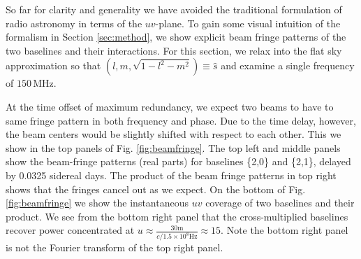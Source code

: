 \documentclass[twocolumn,apj,numberedappendix]{emulateapj}
\renewcommand\[{\begin{equation}}
\renewcommand\]{\end{equation}}
\begin{document}
So far for clarity and generality we have avoided the traditional formulation of radio astronomy in terms of the $uv$-plane. To gain some visual intuition of the formalism in Section \ref{sec:method}, we show explicit beam fringe patterns of the two baselines and their interactions. For this section, we relax into the flat sky approximation so that $(l,m,\sqrt{1-l^2-m^2})\equiv\hat{s}$ and examine a single frequency of $150$\,MHz. 

At the time offset of maximum redundancy, we expect two beams to have to same fringe pattern in both frequency and phase. Due to the time delay, however, the beam centers would be slightly shifted with respect to each other. This we show in the top panels of Fig. \ref{fig:beamfringe}. The top left and middle panels show the beam-fringe
patterns (real parts) for baselines \{2,0\} and \{2,1\}, delayed by 0.0325 sidereal days.
The product of the beam fringe patterns in top right shows that the fringes
 cancel out as we expect. On the bottom of Fig. \ref{fig:beamfringe} we show the instantaneous $uv$ coverage of two baselines and their product. We see from the bottom right panel that the cross-multiplied baselines recover  power concentrated at $u\approx\frac{30\text{m}}{c/1.5\times10^8\text{Hz}}\approx15$. Note the bottom right panel is not the Fourier transform of the top right panel. 
\end{document}
